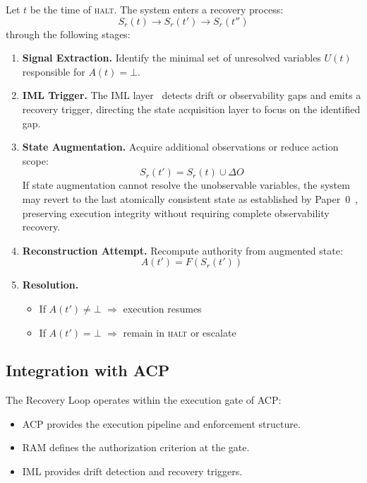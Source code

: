\documentclass[11pt]{article}
\begin{document}
Let $t$ be the time of \textsc{halt}. The system enters a recovery process:
\[
  S_r(t) \rightarrow S_r(t') \rightarrow S_r(t'')
\]
through the following stages:

\begin{enumerate}
  \item \textbf{Signal Extraction.}
        Identify the minimal set of unresolved variables $U(t)$ responsible for
        $A(t) = \bot$.

  \item \textbf{IML Trigger.}
        The IML layer~\cite{fernandez2026c} detects drift or observability gaps and emits
        a recovery trigger, directing the state acquisition layer to focus on the
        identified gap.

  \item \textbf{State Augmentation.}
        Acquire additional observations or reduce action scope:
        \[
          S_r(t') = S_r(t) \cup \Delta O
        \]
        If state augmentation cannot resolve the unobservable variables, the system may
        revert to the last atomically consistent state as established by
        Paper~0~\cite{fernandez2026a}, preserving execution integrity without requiring
        complete observability recovery.

  \item \textbf{Reconstruction Attempt.}
        Recompute authority from augmented state:
        \[
          A(t') = F(S_r(t'))
        \]

  \item \textbf{Resolution.}
        \begin{itemize}
          \item If $A(t') \neq \bot$ $\Rightarrow$ execution resumes
          \item If $A(t') = \bot$ $\Rightarrow$ remain in \textsc{halt} or escalate
        \end{itemize}
\end{enumerate}

\subsection{Integration with ACP}

The Recovery Loop operates within the execution gate of ACP:

\begin{itemize}
  \item ACP provides the execution pipeline and enforcement structure.
  \item RAM defines the authorization criterion at the gate.
  \item IML provides drift detection and recovery triggers.
\end{itemize}
\end{document}
